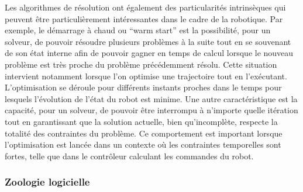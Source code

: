 %
Les algorithmes de résolution ont également des particularités
intrinsèques qui peuvent être particulièrement intéressantes dans le
cadre de la robotique. Par exemple, le démarrage à chaud ou ``warm
start''   est la possibilité, pour un solveur, de pouvoir résoudre
plusieurs problèmes à la suite tout en se souvenant de son état
interne afin de pouvoir gagner en temps de calcul lorsque le nouveau
problème est très proche du problème précédemment résolu. Cette
situation intervient notamment lorsque l'on optimise une trajectoire
tout en l'exécutant. L'optimisation se déroule pour différents
instants proches dans le temps pour lesquels l'évolution de l'état du
robot est minime. Une autre caractéristique est la capacité, pour un
solveur, de pouvoir être interrompu à n'importe quelle itération tout
en garantissant que la solution actuelle, bien qu'incomplète,
respecte la totalité des contraintes du problème. Ce comportement est
important lorsque l'optimisation est lancée dans un contexte où les
contraintes temporelles sont fortes, telle que dans le contrôleur
calculant les commandes du robot.



\subsubsection{Zoologie logicielle}



